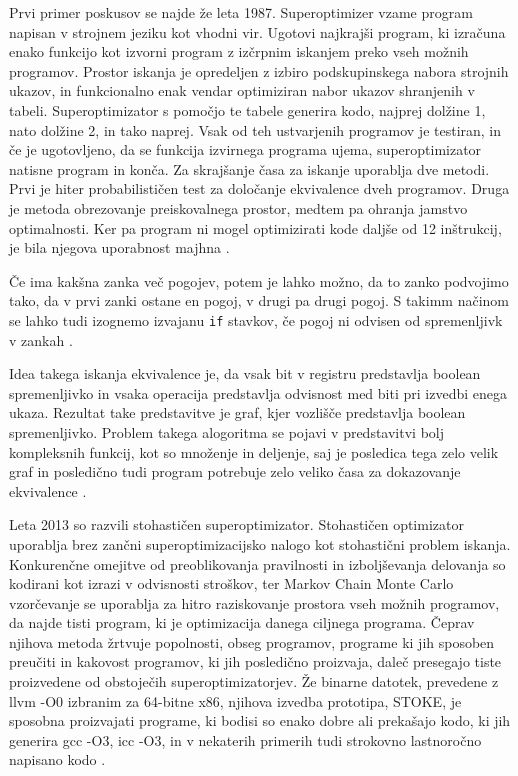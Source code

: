 \documentclass[a4paper, 12pt]{book}
\begin{document}
Prvi primer poskusov se najde že leta 1987. Superoptimizer vzame program napisan v strojnem jeziku kot vhodni vir. Ugotovi  najkrajši program, ki izračuna enako funkcijo kot izvorni program z izčrpnim iskanjem preko vseh možnih programov. Prostor iskanja je opredeljen z izbiro podskupinskega nabora strojnih ukazov, in funkcionalno enak vendar optimiziran nabor ukazov shranjenih v tabeli. Superoptimizator s pomočjo te tabele generira kodo, najprej dolžine 1, nato dolžine 2, in tako naprej. Vsak od teh ustvarjenih programov je testiran, in če je ugotovljeno, da se funkcija izvirnega programa ujema, superoptimizator natisne program in konča. Za skrajšanje časa za iskanje uporablja dve metodi. Prvi je hiter probabilističen test za določanje ekvivalence dveh programov. Druga je metoda obrezovanje preiskovalnega prostor, medtem pa ohranja jamstvo optimalnosti. Ker pa program ni mogel optimizirati kode daljše od 12 inštrukcij, je bila njegova uporabnost majhna \cite{pdf2}.

Če ima kakšna zanka več pogojev, potem je lahko možno, da to zanko podvojimo tako, da v prvi zanki ostane en pogoj, v drugi pa drugi pogoj. S takimm načinom se lahko tudi izognemo izvajanu \texttt{if} stavkov, če pogoj ni odvisen od spremenljivk v zankah \cite{avoid}.

Idea takega iskanja ekvivalence je, da vsak bit v registru predstavlja boolean spremenljivko in vsaka operacija predstavlja odvisnost med biti pri izvedbi enega ukaza. Rezultat take predstavitve je graf, kjer vozlišče predstavlja boolean spremenljivko. Problem takega alogoritma se pojavi v predstavitvi bolj kompleksnih funkcij, kot so množenje in deljenje, saj je posledica tega zelo velik graf in posledično tudi program potrebuje zelo veliko časa za dokazovanje ekvivalence \cite{pdf6}.

Leta 2013 so razvili stohastičen superoptimizator. Stohastičen optimizator uporablja brez zančni superoptimizacijsko nalogo kot stohastični problem iskanja. Konkurenčne omejitve od preoblikovanja pravilnosti in izboljševanja delovanja so kodirani kot izrazi v odvisnosti stroškov, ter Markov Chain Monte Carlo vzorčevanje se uporablja za hitro raziskovanje prostora vseh možnih programov, da najde tisti program, ki je optimizacija danega ciljnega programa. Čeprav njihova metoda žrtvuje popolnosti, obseg programov, programe ki jih sposoben preučiti in kakovost programov, ki jih posledično proizvaja, daleč presegajo tiste proizvedene od obstoječih superoptimizatorjev. Že binarne datotek, prevedene z  llvm -O0 izbranim za 64-bitne x86, njihova izvedba prototipa, STOKE, je sposobna proizvajati programe, ki bodisi so enako dobre ali prekašajo kodo, ki jih generira gcc -O3, icc -O3, in v nekaterih primerih tudi strokovno lastnoročno napisano kodo \cite{article1,article5}.
\end{document}
